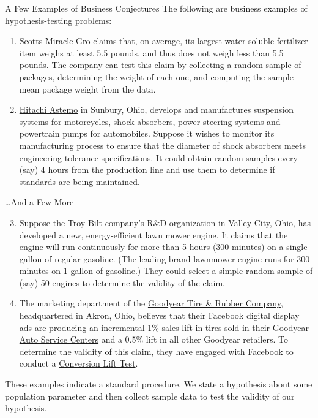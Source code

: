 \documentclass[pdf]{beamer}
\theoremstyle{remark}
\theoremstyle{definition}
\begin{document}
\begin{frame}[t]{A Few Examples of Business Conjectures}
The following are business examples of hypothesis-testing problems: \\
\vspace{0ex}
\small
\begin{enumerate}
\item \href{https://scottsmiraclegro.com/who-we-are/}{Scotts} Miracle-Gro  claims that, on average, its largest water soluble fertilizer item weighs at least 5.5 pounds, and thus does not weigh less than 5.5 pounds. The company can test this claim by collecting a random sample of packages, determining the weight of each one, and computing the sample mean package weight from the data.
\item \href{https://www.hitachiastemo.com/en/groups/americas/}{Hitachi Astemo} in Sunbury, Ohio, develops and manufactures suspension systems for motorcycles, shock absorbers, power steering systems and powertrain pumps for automobiles.  Suppose it wishes to monitor its manufacturing process to ensure that the diameter of shock absorbers meets engineering tolerance specifications. It could obtain random samples every (say) 4 hours from the production line and use them to determine if standards are being maintained.
\end{enumerate}
\end{frame}

\begin{frame}[t]{\ldots And a Few More}
\small
\begin{enumerate} 
  \setcounter{enumi}{2}
\item Suppose the \href{https://www.troybilt.com/en_US/about-us.html}{Troy-Bilt} company's R\&D organization in Valley City, Ohio,  has developed a new, energy-efficient lawn mower engine. It claims that the engine will run continuously for more than 5 hours (300 minutes) on a single gallon of regular gasoline. (The leading brand lawnmower engine runs for 300 minutes on 1 gallon of gasoline.) They could select a simple random sample of (say) 50 engines to determine the validity of the claim.
\item The marketing department of the \href{https://corporate.goodyear.com/us/en.html}{Goodyear Tire \& Rubber Company}, headquartered in Akron, Ohio, believes that their Facebook digital display ads are producing an incremental 1\% sales lift in tires sold in their \href{https://www.goodyearautoservice.com/}{Goodyear Auto Service Centers} and a 0.5\% lift in all other Goodyear retailers.  To determine the validity of this claim, they have engaged with Facebook to conduct a \href{https://www.facebook.com/business/m/one-sheeters/conversion-lift} {Conversion Lift Test}.
\end{enumerate}
\vspace{-1.0ex}
\small
These examples indicate a standard procedure. We state a hypothesis about some population parameter and then collect sample data to test the validity of our hypothesis.
\end{frame}
\end{document}
